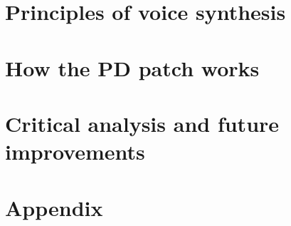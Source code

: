 



	
	\begin{multicols}{2}
	
		\section{Principles of voice synthesis}
		
		
		\section{How the PD patch works}
		
		
		\section{Critical analysis and future improvements}
		
		
	\end{multicols}
	
	\pagebreak
	
	\appendix
	\section{Appendix}
	
	
	\pagebreak
	
	\pagebreak
	
	
	\pagebreak
	
	


